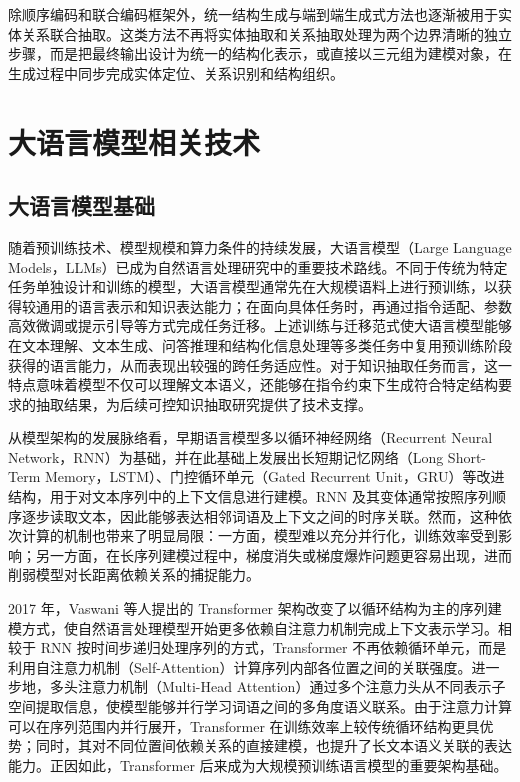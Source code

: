 除顺序编码和联合编码框架外，统一结构生成与端到端生成式方法也逐渐被用于实体关系联合抽取。这类方法不再将实体抽取和关系抽取处理为两个边界清晰的独立步骤，而是把最终输出设计为统一的结构化表示，或直接以三元组为建模对象，在生成过程中同步完成实体定位、关系识别和结构组织\cite{Lu2022UIE,HuguetCabot2021REBEL,Xu2024LLMGenerativeIESurvey,Wang2023InstructUIE}。

\section{大语言模型相关技术}

\subsection{大语言模型基础}

随着预训练技术、模型规模和算力条件的持续发展，大语言模型（Large Language Models，LLMs）已成为自然语言处理研究中的重要技术路线。不同于传统为特定任务单独设计和训练的模型，大语言模型通常先在大规模语料上进行预训练，以获得较通用的语言表示和知识表达能力；在面向具体任务时，再通过指令适配、参数高效微调或提示引导等方式完成任务迁移。上述训练与迁移范式使大语言模型能够在文本理解、文本生成、问答推理和结构化信息处理等多类任务中复用预训练阶段获得的语言能力，从而表现出较强的跨任务适应性。对于知识抽取任务而言，这一特点意味着模型不仅可以理解文本语义，还能够在指令约束下生成符合特定结构要求的抽取结果，为后续可控知识抽取研究提供了技术支撑。

从模型架构的发展脉络看，早期语言模型多以循环神经网络（Recurrent Neural Network，RNN）为基础，并在此基础上发展出长短期记忆网络（Long Short-Term Memory，LSTM）、门控循环单元（Gated Recurrent Unit，GRU）等改进结构，用于对文本序列中的上下文信息进行建模。RNN 及其变体通常按照序列顺序逐步读取文本，因此能够表达相邻词语及上下文之间的时序关联。然而，这种依次计算的机制也带来了明显局限：一方面，模型难以充分并行化，训练效率受到影响；另一方面，在长序列建模过程中，梯度消失或梯度爆炸问题更容易出现，进而削弱模型对长距离依赖关系的捕捉能力\cite{Cho2014RNNEncoderDecoder}。

2017 年，Vaswani 等人提出的 Transformer 架构改变了以循环结构为主的序列建模方式，使自然语言处理模型开始更多依赖自注意力机制完成上下文表示学习\cite{Vaswani2017AttentionIsAllYouNeed}。相较于 RNN 按时间步递归处理序列的方式，Transformer 不再依赖循环单元，而是利用自注意力机制（Self-Attention）计算序列内部各位置之间的关联强度。进一步地，多头注意力机制（Multi-Head Attention）通过多个注意力头从不同表示子空间提取信息，使模型能够并行学习词语之间的多角度语义联系。由于注意力计算可以在序列范围内并行展开，Transformer 在训练效率上较传统循环结构更具优势；同时，其对不同位置间依赖关系的直接建模，也提升了长文本语义关联的表达能力。正因如此，Transformer 后来成为大规模预训练语言模型的重要架构基础。

